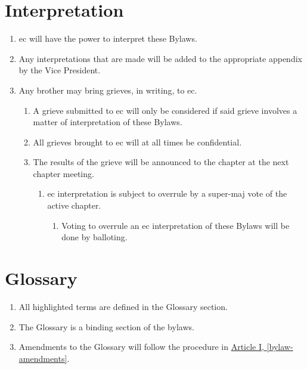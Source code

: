 \section{Interpretation}
	\label{interpretation}
	\begin{enumerate}
		\item \Gls{ec} will have the power to interpret these Bylaws.

		\item Any interpretations that are made will be added to the appropriate appendix by the Vice President.

		\item Any brother may bring \glspl{grieve}, in writing, to \gls{ec}.

		\begin{enumerate}
			\item A \gls{grieve} submitted to \gls{ec} will only be considered if said \gls{grieve} involves a matter of interpretation of these Bylaws.

			\item All \glspl{grieve} brought to \gls{ec} will at all times be confidential.

			\item The results of the \gls{grieve} will be announced to the chapter at the next chapter meeting.

			\begin{enumerate}
				\item \gls{ec} interpretation is subject to overrule by a \gls{super-maj} vote of the active chapter.

				\begin{enumerate}
					\item Voting to overrule an \gls{ec} interpretation of these Bylaws will be done by \gls{balloting}.
				\end{enumerate}
			\end{enumerate}
		\end{enumerate}
	\end{enumerate}

\section{Glossary}
	\begin{enumerate}
		\item All highlighted terms are defined in the Glossary section. 
		\item The Glossary is a binding section of the bylaws. 
		\item Amendments to the Glossary will follow the procedure in \hyperref[bylaw-amendments]{Article I, \autoref*{bylaw-amendments}}.
	\end{enumerate}
	
